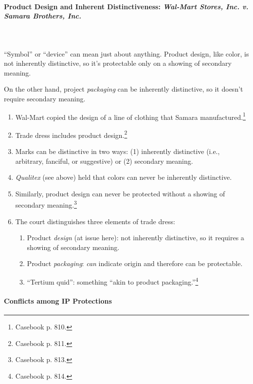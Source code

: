\paragraph{Product Design and Inherent Distinctiveness: \emph{Wal-Mart Stores, 
Inc. v. Samara Brothers, Inc.}}
~\\\\
``Symbol'' or ``device'' can mean just about anything. Product design, like 
color, is not inherently distinctive, so it's protectable only on a showing of 
secondary meaning.

On the other hand, project \emph{packaging} can be inherently distinctive, so 
it doesn't require secondary meaning.

\begin{enumerate}
    \item Wal-Mart copied the design of a line of clothing that Samara 
    manufactured.\footnote{Casebook p. 810.}
    \item Trade dress includes product design.\footnote{Casebook p. 811.}
    \item Marks can be distinctive in two ways: (1) inherently distinctive 
    (i.e., arbitrary, fanciful, or suggestive) or (2) secondary meaning.
    \item \emph{Qualitex} (see above) held that colors can never be inherently 
    distinctive.
    \item Similarly, product design can never be protected without a showing 
    of secondary meaning.\footnote{Casebook p. 813.}
    \item The court distinguishes three elements of trade dress:
    \begin{enumerate}
        \item Product \emph{design} (at issue here): not inherently 
        distinctive, so it requires a showing of secondary meaning.
        \item Product \emph{packaging}: \emph{can} indicate origin and 
        therefore can be protectable.
        \item ``Tertium quid'': something ``akin to product 
        packaging.''\footnote{Casebook p. 814.}
    \end{enumerate}
\end{enumerate}

\paragraph{Conflicts among IP Protections}

